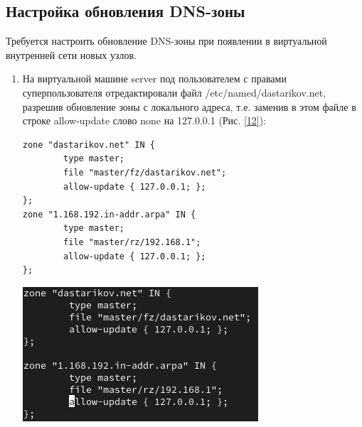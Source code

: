 \subsection{Настройка обновления DNS-зоны}
Требуется настроить обновление DNS-зоны при появлении в виртуальной внутренней сети новых узлов.
\begin{enumerate}
\item На виртуальной машине server под пользователем с правами суперпользователя отредактировали файл /etc/named/dastarikov.net, разрешив обновление зоны с локального адреса, т.е. заменив в этом файле в строке allow-update слово none на 127.0.0.1 (Рис. \ref{12}):
    \begin{verbatim}
zone "dastarikov.net" IN {
        type master;
        file "master/fz/dastarikov.net";
        allow-update { 127.0.0.1; };
};
zone "1.168.192.in-addr.arpa" IN {
        type master;
        file "master/rz/192.168.1";
        allow-update { 127.0.0.1; };
};
    \end{verbatim}

\begin{center}
    \centering
    \includegraphics[width=\textwidth]{../images/image12.png}
    \label{12}
\end{center}


\end{enumerate}
